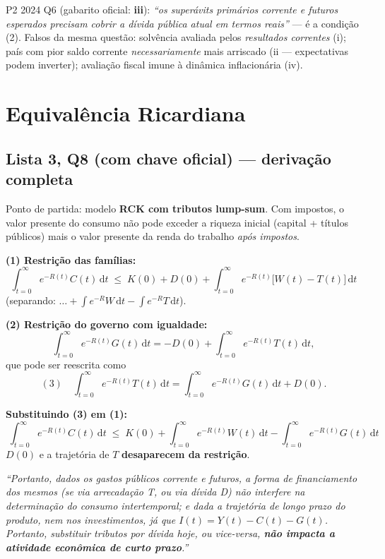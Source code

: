 \documentclass[12pt, a4paper]{article}
\newcommand{\dif}{\mathrm{d}}
\begin{document}
\begin{provabox}[title={Como cai na prova}]
P2 2024 Q6 (gabarito oficial: \textbf{iii}): \emph{``os superávits primários
corrente e futuros esperados precisam cobrir a dívida pública atual em termos
reais''} --- é a condição (2). Falsos da mesma questão: solvência avaliada
pelos \emph{resultados correntes} (i); país com pior saldo corrente
\emph{necessariamente} mais arriscado (ii --- expectativas podem inverter);
avaliação fiscal imune à dinâmica inflacionária (iv).
\end{provabox}

\section{Equivalência Ricardiana}

\subsection{Lista 3, Q8 (com chave oficial) --- derivação completa}

Ponto de partida: modelo \textbf{RCK com tributos lump-sum}. Com impostos, o
valor presente do consumo não pode exceder a riqueza inicial (capital +
títulos públicos) mais o valor presente da renda do trabalho \emph{após
impostos}.

\begin{correctbox}[title={Chave oficial (Q8): passo a passo}]
\textbf{(1) Restrição das famílias:}
\[
\int_{t=0}^{\infty} e^{-R(t)} C(t)\,\dif t
\;\leq\; K(0) + D(0)
+ \int_{t=0}^{\infty} e^{-R(t)}\bigl[W(t) - T(t)\bigr]\,\dif t
\]
(separando: $\dots + \int e^{-R}W\,\dif t - \int e^{-R}T\,\dif t$).

\textbf{(2) Restrição do governo com igualdade:}
\[
\int_{t=0}^{\infty} e^{-R(t)} G(t)\,\dif t
= -D(0) + \int_{t=0}^{\infty} e^{-R(t)} T(t)\,\dif t,
\]
que pode ser reescrita como
\[
(3)\quad \int_{t=0}^{\infty} e^{-R(t)} T(t)\,\dif t
= \int_{t=0}^{\infty} e^{-R(t)} G(t)\,\dif t + D(0).
\]

\textbf{Substituindo (3) em (1):}
\[
\boxed{\;\int_{t=0}^{\infty} e^{-R(t)} C(t)\,\dif t
\;\leq\; K(0)
+ \int_{t=0}^{\infty} e^{-R(t)} W(t)\,\dif t
- \int_{t=0}^{\infty} e^{-R(t)} G(t)\,\dif t\;}
\]
$D(0)$ e a trajetória de $T$ \textbf{desaparecem da restrição}.

\emph{``Portanto, dados os gastos públicos corrente e futuros, a forma de
financiamento dos mesmos (se via arrecadação T, ou via dívida D) não interfere
na determinação do consumo intertemporal; e dada a trajetória de longo prazo
do produto, nem nos investimentos, já que $I(t) = Y(t) - C(t) - G(t)$.
Portanto, substituir tributos por dívida hoje, ou vice-versa, \textbf{não
impacta a atividade econômica de curto prazo}.''}
\end{correctbox}
\end{document}
